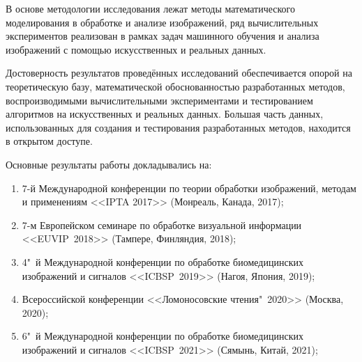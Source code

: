 {\methods} 

В основе методологии исследования лежат методы математического моделирования в обработке и анализе изображений, ряд вычислительных экспериментов реализован в рамках задач машинного обучения и анализа изображений с помощью искусственных и реальных данных.


{\reliability}

Достоверность результатов проведённых исследований обеспечивается опорой на теоретическую базу, математической обоснованностью разработанных методов, воспроизводимыми вычислительными экспериментами и тестированием алгоритмов на искусственных и реальных данных. Большая часть данных, использованных для создания и тестирования разработанных методов, находится в открытом доступе.


{\probation}

Основные результаты работы докладывались на:

\begin {enumerate}[beginpenalty=10000]
	\item 7-й Международной конференции по теории обработки изображений, методам и применениям <<IPTA 2017>> (Монреаль, Канада, 2017);
	
	\item 7-м Европейском семинаре по обработке визуальной информации <<EUVIP~2018>> (Тампере, Финляндия, 2018);
	
	\item 4"~й Международной конференции по обработке биомедицинских изображений и сигналов <<ICBSP~2019>> (Нагоя, Япония, 2019);
	
	\item Всероссийской конференции <<Ломоносовские чтения"~2020>> (Москва, 2020);
	
	\item 6"~й Международной конференции по обработке биомедицинских изображений и сигналов <<ICBSP~2021>> (Сямынь, Китай, 2021);
\end {enumerate}


